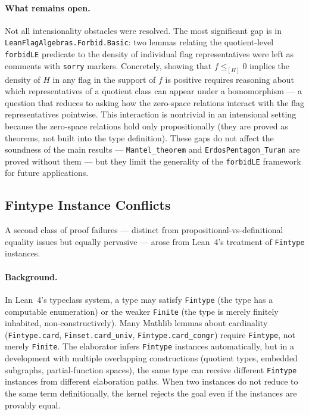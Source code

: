 \documentclass{article}
\newcommand{\lean}[1]{\texttt{#1}}
\begin{document}
\paragraph{What remains open.}
Not all intensionality obstacles were resolved.  The most significant gap is in
\lean{LeanFlagAlgebras.Forbid.Basic}: two lemmas relating the quotient-level
\lean{forbidLE} predicate to the density of individual flag representatives
were left as comments with \lean{sorry} markers.  Concretely, showing that
$f \leq_{[H]} 0$ implies the density of $H$ in any flag in the support of $f$
is positive requires reasoning about which representatives of a quotient class
can appear under a homomorphism --- a question that reduces to asking how the
zero-space relations interact with the flag representatives pointwise.  This
interaction is nontrivial in an intensional setting because the zero-space
relations hold only propositionally (they are proved as theorems, not built into
the type definition).  These gaps do not affect the soundness of the main
results --- \lean{Mantel\_theorem} and \lean{ErdosPentagon\_Turan} are proved
without them --- but they limit the generality of the \lean{forbidLE} framework
for future applications.

\subsection{Fintype Instance Conflicts}
\label{sec:fintype}

A second class of proof failures --- distinct from propositional-vs-definitional
equality issues but equally pervasive --- arose from Lean~4's treatment of
\lean{Fintype} instances.

\paragraph{Background.}
In Lean~4's typeclass system, a type may satisfy \lean{Fintype} (the type has a
computable enumeration) or the weaker \lean{Finite} (the type is merely
finitely inhabited, non-constructively).  Many Mathlib lemmas about cardinality
(\lean{Fintype.card}, \lean{Finset.card\_univ}, \lean{Fintype.card\_congr})
require \lean{Fintype}, not merely \lean{Finite}.  The elaborator infers
\lean{Fintype} instances automatically, but in a development with multiple
overlapping constructions (quotient types, embedded subgraphs, partial-function
spaces), the same type can receive different \lean{Fintype} instances from
different elaboration paths.  When two instances do not reduce to the same term
definitionally, the kernel rejects the goal even if the instances are provably
equal.
\end{document}
